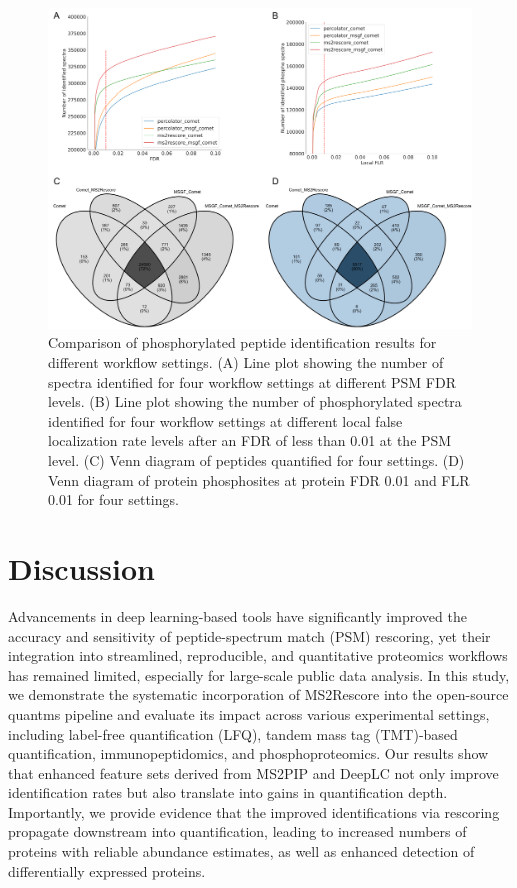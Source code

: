 \documentclass[12pt]{article}
\begin{document}
\begin{figure}[h!]
	\centering
	\includegraphics[width=1\textwidth]{figures//phospho2.png}
	\caption{Comparison of phosphorylated peptide identification results for different workflow settings. (A) Line plot showing the number of spectra identified for four workflow settings at different PSM FDR levels. (B) Line plot showing the number of phosphorylated spectra identified for four workflow settings at different local false localization rate levels after an FDR of less than 0.01 at the PSM level. (C) Venn diagram of peptides quantified for four settings. (D) Venn diagram of protein phosphosites at protein FDR 0.01 and FLR 0.01 for four settings.}
	\label{fig:PXD026824_ms2rescore}
\end{figure}

\section{Discussion}
Advancements in deep learning-based tools have significantly improved the accuracy and sensitivity of peptide-spectrum match (PSM) rescoring, yet their integration into streamlined, reproducible, and quantitative proteomics workflows has remained limited, especially for large-scale public data analysis. In this study, we demonstrate the systematic incorporation of MS2Rescore into the open-source quantms pipeline and evaluate its impact across various experimental settings, including label-free quantification (LFQ), tandem mass tag (TMT)-based quantification, immunopeptidomics, and phosphoproteomics. Our results show that enhanced feature sets derived from MS2PIP and DeepLC not only improve identification rates but also translate into gains in quantification depth. Importantly, we provide evidence that the improved identifications via rescoring propagate downstream into quantification, leading to increased numbers of proteins with reliable abundance estimates, as well as enhanced detection of differentially expressed proteins.
\end{document}
